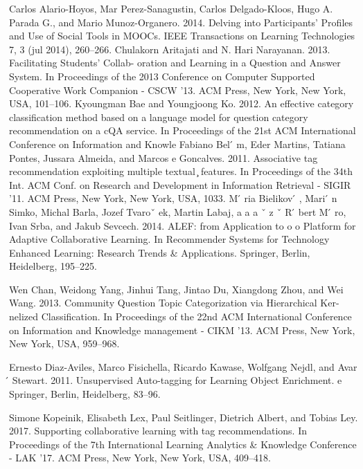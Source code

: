 \documentclass{sig-alternate}
\begin{document}
\begin{thebibliography}{9}
\bibitem{} 
Carlos Alario-Hoyos, Mar Perez-Sanagustin, Carlos Delgado-Kloos, Hugo A.
Parada G., and Mario Munoz-Organero. 2014. Delving into Participants’ Profiles
and Use of Social Tools in MOOCs. IEEE Transactions on Learning Technologies 7,
3 (jul 2014), 260–266.
\bibitem{} 
Chulakorn Aritajati and N. Hari Narayanan. 2013. Facilitating Students’ Collab-
oration and Learning in a Question and Answer System. In Proceedings of the
2013 Conference on Computer Supported Cooperative Work Companion - CSCW
’13. ACM Press, New York, New York, USA, 101–106.
\bibitem{} 
Kyoungman Bae and Youngjoong Ko. 2012. An effective category classification
method based on a language model for question category recommendation
on a cQA service. In Proceedings of the 21st ACM International Conference on
Information and Knowle
\bibitem{} 
Fabiano Bel ́ m, Eder Martins, Tatiana Pontes, Jussara Almeida, and Marcos
e
Goncalves. 2011. Associative tag recommendation exploiting multiple textual
 ̧
features. In Proceedings of the 34th Int. ACM Conf. on Research and Development
in Information Retrieval - SIGIR ’11. ACM Press, New York, New York, USA, 1033.
\bibitem{} 
M ́ ria Bielikov ́ , Mari ́ n Simko, Michal Barla, Jozef Tvaroˇ ek, Martin Labaj,
a
a
a ˇ
z
ˇ
R ́ bert M ́ ro, Ivan Srba, and Jakub Sevcech. 2014. ALEF: from Application to
o
o
Platform for Adaptive Collaborative Learning. In Recommender Systems for
Technology Enhanced Learning: Research Trends & Applications. Springer, Berlin,
Heidelberg, 195–225.

\bibitem{} 
Wen Chan, Weidong Yang, Jinhui Tang, Jintao Du, Xiangdong Zhou, and Wei
Wang. 2013. Community Question Topic Categorization via Hierarchical Ker-
nelized Classification. In Proceedings of the 22nd ACM International Conference
on Information and Knowledge management - CIKM ’13. ACM Press, New York,
New York, USA, 959–968.

\bibitem{} 
Ernesto Diaz-Aviles, Marco Fisichella, Ricardo Kawase, Wolfgang Nejdl, and
Avar ́ Stewart. 2011. Unsupervised Auto-tagging for Learning Object Enrichment.
e
Springer, Berlin, Heidelberg, 83–96.

\bibitem{} 
Simone Kopeinik, Elisabeth Lex, Paul Seitlinger, Dietrich Albert, and Tobias
Ley. 2017. Supporting collaborative learning with tag recommendations. In
Proceedings of the 7th International Learning Analytics & Knowledge Conference -
LAK ’17. ACM Press, New York, New York, USA, 409–418.


\end{thebibliography}
\end{document}
